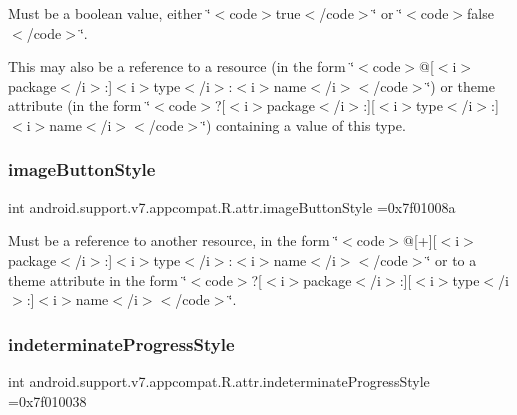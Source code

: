 Must be a boolean value, either \char`\"{}$<$code$>$true$<$/code$>$\char`\"{} or \char`\"{}$<$code$>$false$<$/code$>$\char`\"{}. 

This may also be a reference to a resource (in the form \char`\"{}$<$code$>$@\mbox{[}$<$i$>$package$<$/i$>$\+:\mbox{]}$<$i$>$type$<$/i$>$\+:$<$i$>$name$<$/i$>$$<$/code$>$\char`\"{}) or theme attribute (in the form \char`\"{}$<$code$>$?\mbox{[}$<$i$>$package$<$/i$>$\+:\mbox{]}\mbox{[}$<$i$>$type$<$/i$>$\+:\mbox{]}$<$i$>$name$<$/i$>$$<$/code$>$\char`\"{}) containing a value of this type. \mbox{\label{classandroid_1_1support_1_1v7_1_1appcompat_1_1R_1_1attr_aaf6e8d174819edbd2057100e1d00b6e7}} 
\subsubsection{\texorpdfstring{image\+Button\+Style}{imageButtonStyle}}
{\footnotesize\ttfamily int android.\+support.\+v7.\+appcompat.\+R.\+attr.\+image\+Button\+Style =0x7f01008a\hspace{0.3cm}{\ttfamily [static]}}

Must be a reference to another resource, in the form \char`\"{}$<$code$>$@\mbox{[}+\mbox{]}\mbox{[}$<$i$>$package$<$/i$>$\+:\mbox{]}$<$i$>$type$<$/i$>$\+:$<$i$>$name$<$/i$>$$<$/code$>$\char`\"{} or to a theme attribute in the form \char`\"{}$<$code$>$?\mbox{[}$<$i$>$package$<$/i$>$\+:\mbox{]}\mbox{[}$<$i$>$type$<$/i$>$\+:\mbox{]}$<$i$>$name$<$/i$>$$<$/code$>$\char`\"{}. \mbox{\label{classandroid_1_1support_1_1v7_1_1appcompat_1_1R_1_1attr_adde2f2aab981417a891cc25b344b12a3}} 
\subsubsection{\texorpdfstring{indeterminate\+Progress\+Style}{indeterminateProgressStyle}}
{\footnotesize\ttfamily int android.\+support.\+v7.\+appcompat.\+R.\+attr.\+indeterminate\+Progress\+Style =0x7f010038\hspace{0.3cm}{\ttfamily [static]}}

